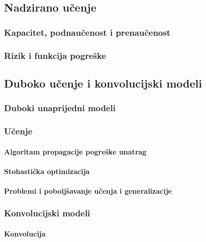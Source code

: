 \documentclass[oneside]{book}
\begin{document}
\subsection{Nadzirano učenje}

\subsubsection{Kapacitet, podnaučenost i prenaučenost}

\subsubsection{Rizik i funkcija pogreške}


\subsection{Duboko učenje i konvolucijski modeli}

\subsubsection{Duboki unaprijedni modeli}

\subsubsection{Učenje}

\paragraph{Algoritam propagacije pogreške unatrag}

\paragraph{Stohastička optimizacija}

\paragraph{Problemi i poboljšavanje učenja i generalizacije}

\subsubsection{Konvolucijski modeli}

\paragraph{Konvolucija}
\end{document}
